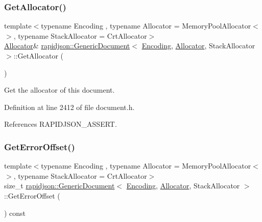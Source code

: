 \subsubsection{\texorpdfstring{GetAllocator()}{GetAllocator()}}
{\footnotesize\ttfamily template$<$typename Encoding , typename Allocator  = Memory\+Pool\+Allocator$<$$>$, typename Stack\+Allocator  = Crt\+Allocator$>$ \\
\mbox{\hyperlink{classrapidjson_1_1_allocator}{Allocator}}\& \mbox{\hyperlink{classrapidjson_1_1_generic_document}{rapidjson\+::\+Generic\+Document}}$<$ \mbox{\hyperlink{classrapidjson_1_1_encoding}{Encoding}}, \mbox{\hyperlink{classrapidjson_1_1_allocator}{Allocator}}, Stack\+Allocator $>$\+::Get\+Allocator (\begin{DoxyParamCaption}{ }\end{DoxyParamCaption})}



Get the allocator of this document. 



Definition at line 2412 of file document.\+h.


\begin{DoxyCode}{0}

\end{DoxyCode}


References R\+A\+P\+I\+D\+J\+S\+O\+N\+\_\+\+A\+S\+S\+E\+RT.

\mbox{\label{classrapidjson_1_1_generic_document_af532179ca5ad5434a5e8af63f5da4c5f}} 
\subsubsection{\texorpdfstring{GetErrorOffset()}{GetErrorOffset()}}
{\footnotesize\ttfamily template$<$typename Encoding , typename Allocator  = Memory\+Pool\+Allocator$<$$>$, typename Stack\+Allocator  = Crt\+Allocator$>$ \\
size\+\_\+t \mbox{\hyperlink{classrapidjson_1_1_generic_document}{rapidjson\+::\+Generic\+Document}}$<$ \mbox{\hyperlink{classrapidjson_1_1_encoding}{Encoding}}, \mbox{\hyperlink{classrapidjson_1_1_allocator}{Allocator}}, Stack\+Allocator $>$\+::Get\+Error\+Offset (\begin{DoxyParamCaption}{ }\end{DoxyParamCaption}) const}



